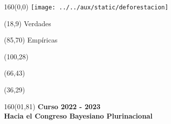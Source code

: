 \documentclass[shownotes,aspectratio=169]{beamer}
\begin{document}
\begin{frame}


\begin{textblock}{160}(0,0)
\texttt{[image: ../../aux/static/deforestacion]}
\end{textblock}

\begin{textblock}{80}(18,9)
\textcolor{black!15}{\fontsize{44}{55}\selectfont Verdades}
\end{textblock}

\begin{textblock}{47}(85,70)
\centering \textcolor{black!15}{{\fontsize{52}{65}\selectfont Empíricas}}
\end{textblock}

\begin{textblock}{80}(100,28)
\LARGE  \textcolor{black!15}{}
\end{textblock}

\begin{textblock}{80}(66,43)
\LARGE  \textcolor{black!15}{\scalebox{6}{$=$}}
\end{textblock}

\begin{textblock}{80}(36,29)
\LARGE  \textcolor{black!15}{\scalebox{9}{$p$}}
\end{textblock}

\vspace{2cm}
\maketitle



\begin{textblock}{160}(01,81)
\textcolor{black!5}{\textbf{\Large Curso 2022 - 2023 \\
\scriptsize Hacia el Congreso Bayesiano Plurinacional\\}}
\end{textblock}

\end{frame}
\end{document}
